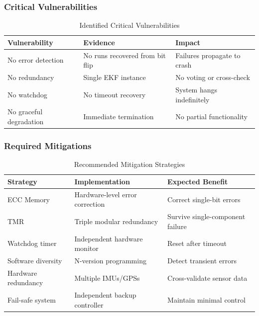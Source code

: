 \documentclass[11pt,a4paper]{article}
\begin{document}
\subsubsection{Critical Vulnerabilities}

\begin{table}[H]
\centering
\caption{Identified Critical Vulnerabilities}
\label{tab:vulnerabilities}
\begin{tabular}{@{}lp{5cm}p{5cm}@{}}
\toprule
\textbf{Vulnerability} & \textbf{Evidence} & \textbf{Impact} \\
\midrule
No error detection & No runs recovered from bit flip & Failures propagate to crash \\
No redundancy & Single EKF instance & No voting or cross-check \\
No watchdog & No timeout recovery & System hangs indefinitely \\
No graceful degradation & Immediate termination & No partial functionality \\
\bottomrule
\end{tabular}
\end{table}

\subsubsection{Required Mitigations}

\begin{table}[H]
\centering
\caption{Recommended Mitigation Strategies}
\label{tab:mitigations}
\begin{tabular}{@{}lp{4cm}p{5cm}@{}}
\toprule
\textbf{Strategy} & \textbf{Implementation} & \textbf{Expected Benefit} \\
\midrule
ECC Memory & Hardware-level error correction & Correct single-bit errors \\
TMR & Triple modular redundancy & Survive single-component failure \\
Watchdog timer & Independent hardware monitor & Reset after timeout \\
Software diversity & N-version programming & Detect transient errors \\
Hardware redundancy & Multiple IMUs/GPSs & Cross-validate sensor data \\
Fail-safe system & Independent backup controller & Maintain minimal control \\
\bottomrule
\end{tabular}
\end{table}
\end{document}
